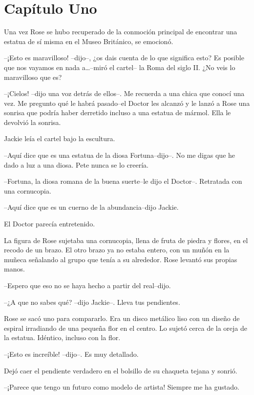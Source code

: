 \chapter*{Capítulo Uno}

Una vez Rose se hubo recuperado de la conmoción principal de encontrar
una estatua de sí misma en el Museo Británico, se emocionó.

--¡Esto es maravilloso! --dijo--, ¿os dais cuenta de lo que significa
esto? Es posible que nos vayamos en nada a\ldots{}--miró el cartel-- la
Roma del siglo II. ¿No veis lo maravilloso que es?

--¡Cielos! --dijo una voz detrás de ellos--. Me recuerda a una chica que
conocí una vez. Me pregunto qué le habrá pasado--el Doctor les alcanzó y
le lanzó a Rose una sonrisa que podría haber derretido incluso a una
estatua de mármol. Ella le devolvió la sonrisa.

Jackie leía el cartel bajo la escultura.

--Aquí dice que es una estatua de la diosa Fortuna--dijo--. No me digas
que he dado a luz a una diosa. Pete nunca se lo creería.

--Fortuna, la diosa romana de la buena suerte--le dijo el Doctor--.
Retratada con una cornucopia.

--Aquí dice que es un cuerno de la abundancia--dijo Jackie.

El Doctor parecía entretenido.

La figura de Rose sujetaba una cornucopia, llena de fruta de piedra y
flores, en el recodo de un brazo. El otro brazo ya no estaba entero, con
un muñón en la muñeca señalando al grupo que tenía a su alrededor. Rose
levantó sus propias manos.

--Espero que eso no se haya hecho a partir del real--dijo.

--¿A que no sabes qué? --dijo Jackie--. Lleva tus pendientes.

Rose se sacó uno para compararlo. Era un disco metálico liso con un
diseño de espiral irradiando de una pequeña flor en el centro. Lo sujetó
cerca de la oreja de la estatua. Idéntico, incluso con la flor.

--¡Esto es increíble! --dijo--. Es muy detallado.

Dejó caer el pendiente verdadero en el bolsillo de su chaqueta tejana y
sonrió.

--¡Parece que tengo un futuro como modelo de artista! Siempre me ha
gustado.

